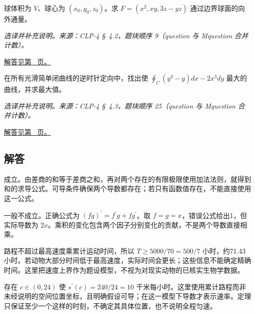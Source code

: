 \documentclass[12pt,fontset=fandol]{ctexart}
\begin{document}
\begin{example}[平移球的线性散度积分]\label{ex:c45q24}
球体积为 $V$、球心为 $(x_0,y_0,z_0)$。求 $F=(x^2,xy,3z-yz)$ 通过边界球面的向外通量。
\par\textit{选译并补充说明。来源：CLP-4 \S~4.2，题块顺序 9（question 与 Mquestion 合并计数）。}\par\hyperref[ans:c45q24]{解答见第~\pageref{ans:c45q24} 页。}
\end{example}
\begin{example}[选择使环流最大的曲线]\label{ex:c45q25}
在所有光滑简单闭曲线的逆时针定向中，找出使 $\oint_C(y^3-y)dx-2x^3dy$ 最大的曲线，并求最大值。
\par\textit{选译并补充说明。来源：CLP-4 \S~4.3，题块顺序 25（question 与 Mquestion 合并计数）。}\par\hyperref[ans:c45q25]{解答见第~\pageref{ans:c45q25} 页。}
\end{example}
\subsection{解答}
\begin{solve}\label{ans:c45q1}
成立。由差商的和等于差商之和，再对两个存在的有限极限使用加法法则，就得到和的求导公式。可导条件确保两个导数都存在；若只有函数值存在，不能直接使用这一公式。
\end{solve}

\begin{solve}\label{ans:c45q2}
一般不成立。正确公式为 $(fg)^{\prime}=f^{\prime}g+fg^{\prime}$。取 $f=g=x$，错误公式给出1，但实际导数为 $2x$。乘积的变化包含两个因子分别变化的贡献，不是两个导数直接相乘。
\end{solve}

\begin{solve}\label{ans:c45q3}
路程不超过最高速度乘累计运动时间，所以 $T\ge5000/70=500/7$ 小时，约71.43小时。若动物大部分时间低于最高速度，实际时间会更长；这些信息不能确定精确时间。这里把速度上界作为题设模型，不视为对现实动物的已核实生物学数据。
\end{solve}

\begin{solve}\label{ans:c45q4}
存在 $c\in(0,24)$ 使 $s^{\prime}(c)=240/24=10$ 千米每小时。这里使用累计路程而非未经说明的空间位置坐标，且明确假设可导；在这一模型下导数才表示速率。定理只保证至少一个这样的时刻，不确定其具体位置，也不说明全程匀速。
\end{solve}
\end{document}
